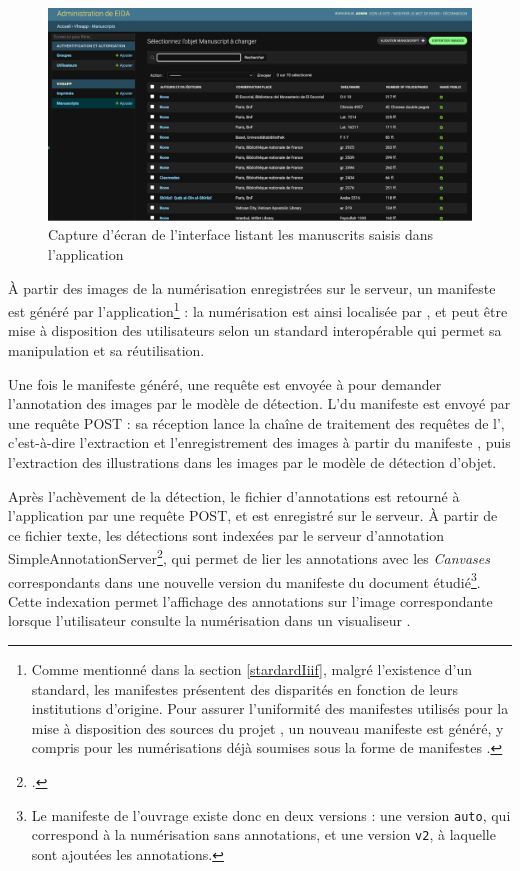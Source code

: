 	\begin{figure}[h]
		\centering
		\includegraphics[width=16cm]{images/eida_list.png}
		\caption{Capture d'écran de l'interface listant les manuscrits saisis dans l'application \eida}
		\label{fig:eida_list}
	\end{figure}

	À partir des images de la numérisation enregistrées sur le serveur, un manifeste \iiif est généré par l'application\footnote{Comme mentionné dans la section \ref{stardardIiif}, malgré l'existence d'un standard, les manifestes \iiif présentent des disparités en fonction de leurs institutions d'origine. Pour assurer l'uniformité des manifestes utilisés pour la mise à disposition des sources du projet \eida, un nouveau manifeste est généré, y compris pour les numérisations déjà soumises sous la forme de manifestes \iiif.} : la numérisation est ainsi localisée par \URL, et peut être mise à disposition des utilisateurs selon un standard interopérable qui permet sa manipulation et sa réutilisation.
	
	Une fois le manifeste \iiif généré, une requête est envoyée à \exapi pour demander l'annotation des images par le modèle de détection. L'\URL du manifeste est envoyé par une requête \http POST : sa réception lance la chaîne de traitement des requêtes de l'\api, c'est-à-dire l'extraction et l'enregistrement des images à partir du manifeste \iiif, puis l'extraction des illustrations dans les images par le modèle de détection d'objet. 
	
	Après l'achèvement de la détection, le fichier d'annotations est retourné à l'application par une requête POST, et est enregistré sur le serveur. À partir de ce fichier texte, les détections sont indexées par le serveur \iiif d'annotation SimpleAnnotationServer\footcite{WelcomeSimpleAnnotation}, qui permet de lier les annotations avec les \textit{Canvases} correspondants dans une nouvelle version du manifeste \iiif du document étudié\footnote{Le manifeste \iiif de l'ouvrage existe donc en deux versions : une version \texttt{auto}, qui correspond à la numérisation sans annotations, et une version \texttt{v2}, à laquelle sont ajoutées les annotations.}. Cette indexation permet l'affichage des annotations sur l'image correspondante lorsque l'utilisateur consulte la numérisation dans un visualiseur \iiif.
	
